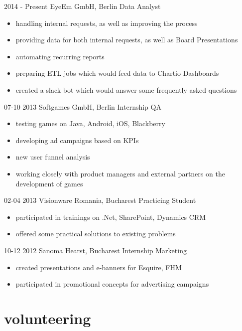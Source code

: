 \documentclass[]{friggeri-cv}
\begin{document}
\begin{entrylist}
  \entry
    {2014 - Present}
    { EyeEm GmbH, Berlin}
    {Data Analyst}
    {\begin{itemize}
    \item handling internal requests, as well as improving the process
    \item providing data for both internal requests, as well as Board Presentations
    \item automating recurring reports
    \item preparing ETL jobs which would feed data to Chartio Dashboards
    \item created a slack bot which would answer some frequently asked questions
    \end{itemize}}
  \entry
    {07-10 2013}
    {Softgames GmbH, Berlin}
    {Internship QA}
    {\begin{itemize}
    \item testing games on Java, Android, iOS, Blackberry
    \item developing ad campaigns based on KPIs
    \item new user funnel analysis
    \item working closely with product managers and external partners on the development of games
    \end{itemize}}
  \entry
    {02-04 2013}
    {Visionware Romania, Bucharest}
    {Practicing Student}
    {\begin{itemize}
    \item participated in trainings on .Net, SharePoint, Dynamics CRM
    \item offered some practical solutions to existing problems
    \end{itemize}}
  \entry
    {10-12 2012}
    {Sanoma Hearst, Bucharest}
    {Internship Marketing}
    {\begin{itemize}
    \item created presentations and e-banners for Esquire, FHM
    \item participated in  promotional concepts for advertising campaigns
    \end{itemize}}
\end{entrylist}

\pagebreak

\section{volunteering}
\end{document}
